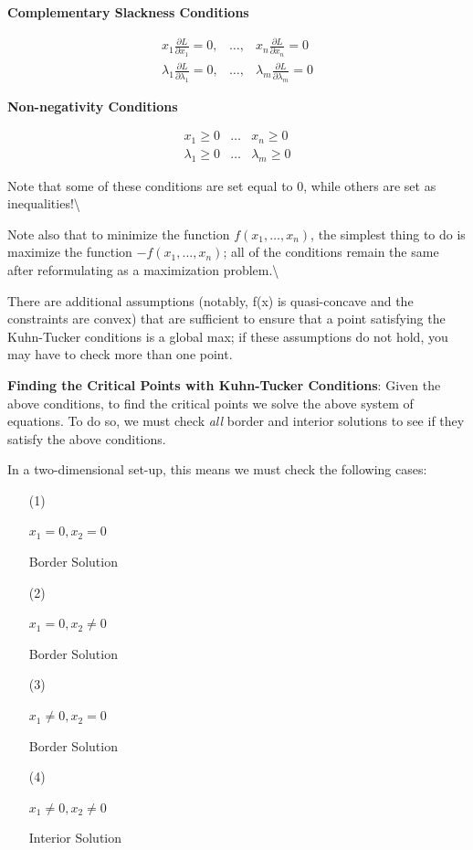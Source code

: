 \documentclass[]{book}
\theoremstyle{definition}
\theoremstyle{definition}
\theoremstyle{definition}
\theoremstyle{remark}
\begin{document}
\textbf{Complementary Slackness Conditions}

\begin{eqnarray*}
x_1\frac{\partial L}{\partial x_1} = 0, & \dots, & x_n\frac{\partial L}{\partial x_n} = 0\\
\lambda_1\frac{\partial L}{\partial \lambda_1} = 0, & \dots, & \lambda_m \frac{\partial L}{\partial \lambda_m} = 0
\end{eqnarray*}

\textbf{Non-negativity Conditions}

\begin{eqnarray*}
x_1 \geq 0 & \dots & x_n \geq 0\\
\lambda_1 \geq 0 & \dots & \lambda_m \geq 0
\end{eqnarray*}

Note that some of these conditions are set equal to 0, while others are
set as inequalities!\textbackslash{}

Note also that to minimize the function \(f(x_1, \dots, x_n)\), the
simplest thing to do is maximize the function \(-f(x_1, \dots, x_n)\);
all of the conditions remain the same after reformulating as a
maximization problem.\textbackslash{}

There are additional assumptions (notably, f(x) is quasi-concave and the
constraints are convex) that are sufficient to ensure that a point
satisfying the Kuhn-Tucker conditions is a global max; if these
assumptions do not hold, you may have to check more than one point.

\textbf{Finding the Critical Points with Kuhn-Tucker Conditions}: Given
the above conditions, to find the critical points we solve the above
system of equations. To do so, we must check \textit{all} border and
interior solutions to see if they satisfy the above conditions.

In a two-dimensional set-up, this means we must check the following
cases:

\begin{enumerate}
\item[(1)] \parbox[c]{2in}{$x_1 = 0, x_2 = 0$} \parbox{2in}{Border Solution}
\item[(2)] \parbox[c]{2in}{$x_1 = 0, x_2 \neq 0$} \parbox{2in}{Border Solution}
\item[(3)] \parbox[c]{2in}{$x_1 \neq 0, x_2 = 0$} \parbox{2in}{Border Solution}
\item[(4)] \parbox[c]{2in}{$x_1 \neq 0, x_2 \neq 0$} \parbox{2in}{Interior Solution}\\
\end{enumerate}
\end{document}
